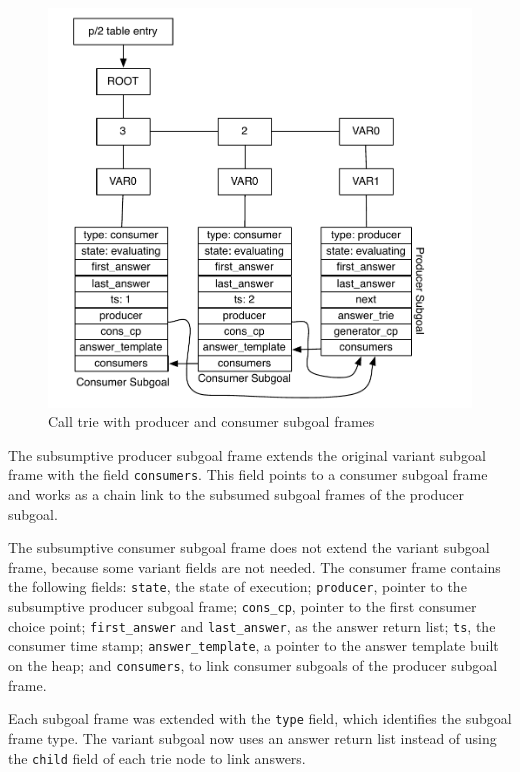 \begin{figure}[H]
  \centering
    \includegraphics[scale=0.6]{subgoal_frames.pdf}
  \caption{Call trie with producer and consumer subgoal frames}
  \label{fig:subgoal_frames}
\end{figure}

The subsumptive producer subgoal frame extends the original variant subgoal frame
with the field \texttt{consumers}. This field points to a consumer subgoal frame and works
as a chain link to the subsumed subgoal frames of the producer subgoal.

The subsumptive consumer subgoal frame does not extend the variant subgoal frame, because
some variant fields are not needed.
The consumer frame contains the following fields: \texttt{state}, the state of execution;
\texttt{producer}, pointer to the subsumptive producer subgoal frame; \texttt{cons\_cp},
pointer to the first consumer choice point; \texttt{first\_answer} and \texttt{last\_answer},
as the answer return list; \texttt{ts}, the consumer time stamp; \texttt{answer\_template},
a pointer to the answer template built on the heap; and \texttt{consumers},
to link consumer subgoals of the producer subgoal frame.

Each subgoal frame was extended with the \texttt{type} field, which identifies the subgoal frame type.
The variant subgoal now uses an answer return list instead of using the \texttt{child} field of
each trie node to link answers.

